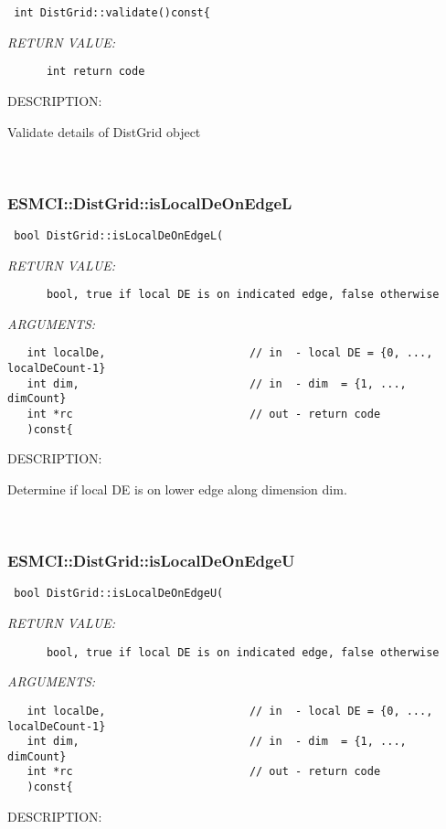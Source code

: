   
\begin{verbatim} int DistGrid::validate()const{\end{verbatim}{\em RETURN VALUE:}
\begin{verbatim}      int return code\end{verbatim}
{\sf DESCRIPTION:\\ }


      Validate details of DistGrid object 
   
 
\mbox{}\hrulefill\
 
\subsubsection [ESMCI::DistGrid::isLocalDeOnEdgeL] {ESMCI::DistGrid::isLocalDeOnEdgeL}


  
\begin{verbatim} bool DistGrid::isLocalDeOnEdgeL(\end{verbatim}{\em RETURN VALUE:}
\begin{verbatim}      bool, true if local DE is on indicated edge, false otherwise\end{verbatim}{\em ARGUMENTS:}
\begin{verbatim}   int localDe,                      // in  - local DE = {0, ..., localDeCount-1}
   int dim,                          // in  - dim  = {1, ..., dimCount}
   int *rc                           // out - return code
   )const{\end{verbatim}
{\sf DESCRIPTION:\\ }


      Determine if local DE is on lower edge along dimension dim.
   
 
\mbox{}\hrulefill\
 
\subsubsection [ESMCI::DistGrid::isLocalDeOnEdgeU] {ESMCI::DistGrid::isLocalDeOnEdgeU}


  
\begin{verbatim} bool DistGrid::isLocalDeOnEdgeU(\end{verbatim}{\em RETURN VALUE:}
\begin{verbatim}      bool, true if local DE is on indicated edge, false otherwise\end{verbatim}{\em ARGUMENTS:}
\begin{verbatim}   int localDe,                      // in  - local DE = {0, ..., localDeCount-1}
   int dim,                          // in  - dim  = {1, ..., dimCount}
   int *rc                           // out - return code
   )const{\end{verbatim}
{\sf DESCRIPTION:\\ }


